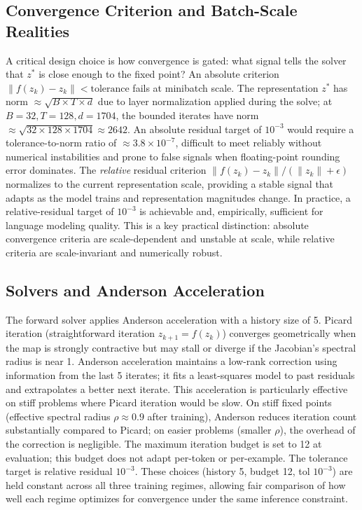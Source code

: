 \subsection*{Convergence Criterion and Batch-Scale Realities}

A critical design choice is how convergence is gated: what signal tells the solver that $z^*$ is close enough to the fixed point? An absolute criterion $\|f(z_k) - z_k\| < \text{tolerance}$ fails at minibatch scale. The representation $z^*$ has norm $\approx \sqrt{B \times T \times d}$ due to layer normalization applied during the solve; at $B=32, T=128, d=1704$, the bounded iterates have norm $\approx \sqrt{32 \times 128 \times 1704} \approx 2642$. An absolute residual target of $10^{-3}$ would require a tolerance-to-norm ratio of $\approx 3.8 \times 10^{-7}$, difficult to meet reliably without numerical instabilities and prone to false signals when floating-point rounding error dominates. The \emph{relative} residual criterion $\|f(z_k) - z_k\| / (\|z_k\| + \epsilon)$ normalizes to the current representation scale, providing a stable signal that adapts as the model trains and representation magnitudes change. In practice, a relative-residual target of $10^{-3}$ is achievable and, empirically, sufficient for language modeling quality. This is a key practical distinction: absolute convergence criteria are scale-dependent and unstable at scale, while relative criteria are scale-invariant and numerically robust.

\subsection*{Solvers and Anderson Acceleration}

The forward solver applies Anderson acceleration with a history size of 5. Picard iteration (straightforward iteration $z_{k+1} = f(z_k)$) converges geometrically when the map is strongly contractive but may stall or diverge if the Jacobian's spectral radius is near 1. Anderson acceleration maintains a low-rank correction using information from the last 5 iterates; it fits a least-squares model to past residuals and extrapolates a better next iterate. This acceleration is particularly effective on stiff problems where Picard iteration would be slow. On stiff fixed points (effective spectral radius $\rho \approx 0.9$ after training), Anderson reduces iteration count substantially compared to Picard; on easier problems (smaller $\rho$), the overhead of the correction is negligible. The maximum iteration budget is set to 12 at evaluation; this budget does not adapt per-token or per-example. The tolerance target is relative residual $10^{-3}$. These choices (history 5, budget 12, tol $10^{-3}$) are held constant across all three training regimes, allowing fair comparison of how well each regime optimizes for convergence under the same inference constraint.

